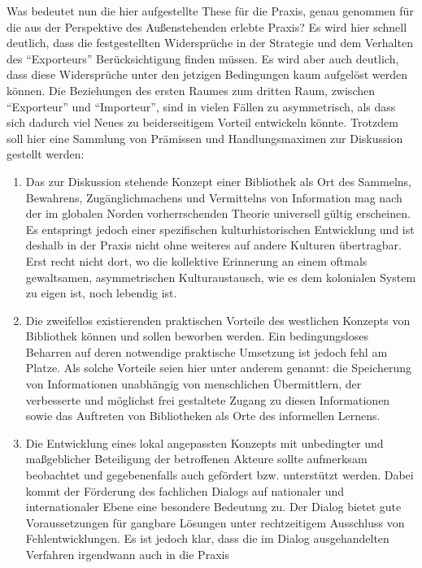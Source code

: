\documentclass[a4paper,
fontsize=11pt,
oneside,
numbers=noperiodatend,
parskip=half-,
bibliography=totoc,
final
]{scrartcl}
\begin{document}
Was bedeutet nun die hier aufgestellte These für die Praxis, genau
genommen für die aus der Perspektive des Außenstehenden erlebte Praxis?
Es wird hier schnell deutlich, dass die festgestellten Widersprüche in
der Strategie und dem Verhalten des \enquote{Exporteurs}
Berücksichtigung finden müssen. Es wird aber auch deutlich, dass diese
Widersprüche unter den jetzigen Bedingungen kaum aufgelöst werden
können. Die Beziehungen des ersten Raumes zum dritten Raum, zwischen
\enquote{Exporteur} und \enquote{Importeur}, sind in vielen Fällen zu
asymmetrisch, als dass sich dadurch viel Neues zu beiderseitigem Vorteil
entwickeln könnte. Trotzdem soll hier eine Sammlung von Prämissen und
Handlungsmaximen zur Diskussion gestellt werden:

\begin{enumerate}
\def\labelenumi{\arabic{enumi}.}
\item
  Das zur Diskussion stehende Konzept einer Bibliothek als Ort des
  Sammelns, Bewahrens, Zugänglichmachens und Vermittelns von Information
  mag nach der im globalen Norden vorherrschenden Theorie universell
  gültig erscheinen. Es entspringt jedoch einer spezifischen
  kulturhistorischen Entwicklung und ist deshalb in der Praxis nicht
  ohne weiteres auf andere Kulturen übertragbar. Erst recht nicht dort,
  wo die kollektive Erinnerung an einem oftmals gewaltsamen,
  asymmetrischen Kulturaustausch, wie es dem kolonialen System zu eigen
  ist, noch lebendig ist.
\item
  Die zweifellos existierenden praktischen Vorteile des westlichen
  Konzepts von Bibliothek können und sollen beworben werden. Ein
  bedingungsloses Beharren auf deren notwendige praktische Umsetzung ist
  jedoch fehl am Platze. Als solche Vorteile seien hier unter anderem
  genannt: die Speicherung von Informationen unabhängig von menschlichen
  Übermittlern, der verbesserte und möglichst frei gestaltete Zugang zu
  diesen Informationen sowie das Auftreten von Bibliotheken als Orte des
  informellen Lernens.
\item
  Die Entwicklung eines lokal angepassten Konzepts mit unbedingter und
  maßgeblicher Beteiligung der betroffenen Akteure sollte aufmerksam
  beobachtet und gegebenenfalls auch gefördert bzw. unterstützt werden.
  Dabei kommt der Förderung des fachlichen Dialogs auf nationaler und
  internationaler Ebene eine besondere Bedeutung zu. Der Dialog bietet
  gute Voraussetzungen für gangbare Lösungen unter rechtzeitigem
  Ausschluss von Fehlentwicklungen. Es ist jedoch klar, dass die im
  Dialog ausgehandelten Verfahren irgendwann auch in die Praxis

\end{enumerate}
\end{document}
